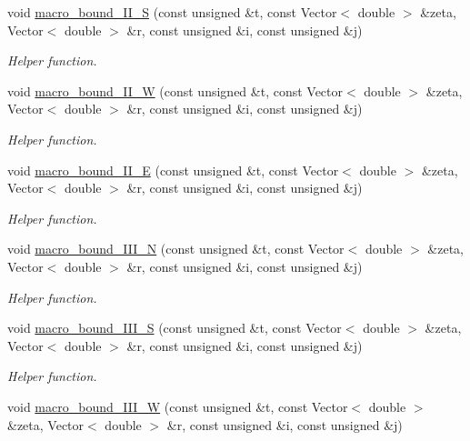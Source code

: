 \begin{DoxyCompactItemize}
void \hyperlink{classoomph_1_1ChannelWithLeafletDomain_a565166bede89908189cc8e426a898859}{macro\+\_\+bound\+\_\+\+I\+I\+\_\+S} (const unsigned \&t, const Vector$<$ double $>$ \&zeta, Vector$<$ double $>$ \&r, const unsigned \&i, const unsigned \&j)
\begin{DoxyCompactList}\small\item\em Helper function. \end{DoxyCompactList}\item 
void \hyperlink{classoomph_1_1ChannelWithLeafletDomain_afa35af75e7a60d3e5d4adf6a8097825e}{macro\+\_\+bound\+\_\+\+I\+I\+\_\+W} (const unsigned \&t, const Vector$<$ double $>$ \&zeta, Vector$<$ double $>$ \&r, const unsigned \&i, const unsigned \&j)
\begin{DoxyCompactList}\small\item\em Helper function. \end{DoxyCompactList}\item 
void \hyperlink{classoomph_1_1ChannelWithLeafletDomain_a9083a5ac562feb1cd33d78e6cc18b257}{macro\+\_\+bound\+\_\+\+I\+I\+\_\+E} (const unsigned \&t, const Vector$<$ double $>$ \&zeta, Vector$<$ double $>$ \&r, const unsigned \&i, const unsigned \&j)
\begin{DoxyCompactList}\small\item\em Helper function. \end{DoxyCompactList}\item 
void \hyperlink{classoomph_1_1ChannelWithLeafletDomain_a8b7f88fb218ceb09f0fde09ba22cd5b9}{macro\+\_\+bound\+\_\+\+I\+I\+I\+\_\+N} (const unsigned \&t, const Vector$<$ double $>$ \&zeta, Vector$<$ double $>$ \&r, const unsigned \&i, const unsigned \&j)
\begin{DoxyCompactList}\small\item\em Helper function. \end{DoxyCompactList}\item 
void \hyperlink{classoomph_1_1ChannelWithLeafletDomain_aacdeafe878caadb3e6d0cf98a87df25a}{macro\+\_\+bound\+\_\+\+I\+I\+I\+\_\+S} (const unsigned \&t, const Vector$<$ double $>$ \&zeta, Vector$<$ double $>$ \&r, const unsigned \&i, const unsigned \&j)
\begin{DoxyCompactList}\small\item\em Helper function. \end{DoxyCompactList}\item 
void \hyperlink{classoomph_1_1ChannelWithLeafletDomain_a06ccb5b6d160c3a31acf80174381a834}{macro\+\_\+bound\+\_\+\+I\+I\+I\+\_\+W} (const unsigned \&t, const Vector$<$ double $>$ \&zeta, Vector$<$ double $>$ \&r, const unsigned \&i, const unsigned \&j)

\end{DoxyCompactItemize}
